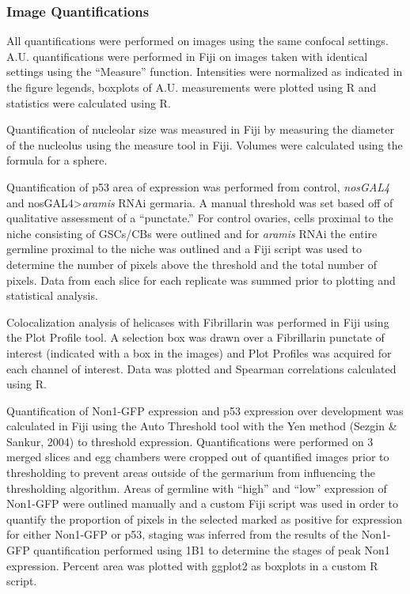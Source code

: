 \documentclass[12pt,oneside]{reedthesis}
\begin{document}
\hypertarget{image-quantifications}{%
\subsubsection{Image Quantifications}\label{image-quantifications}}

All quantifications were performed on images using the same confocal settings. A.U. quantifications were performed in Fiji on images taken with identical settings using the ``Measure'' function. Intensities were normalized as indicated in the figure legends, boxplots of A.U. measurements were plotted using R and statistics were calculated using R.

Quantification of nucleolar size was measured in Fiji by measuring the diameter of the nucleolus using the measure tool in Fiji. Volumes were calculated using the formula for a sphere.

Quantification of p53 area of expression was performed from control, \emph{nosGAL4} and nosGAL4\textgreater{}\emph{aramis} RNAi germaria. A manual threshold was set based off of qualitative assessment of a ``punctate.'' For control ovaries, cells proximal to the niche consisting of GSCs/CBs were outlined and for \emph{aramis} RNAi the entire germline proximal to the niche was outlined and a Fiji script was used to determine the number of pixels above the threshold and the total number of pixels. Data from each slice for each replicate was summed prior to plotting and statistical analysis.

Colocalization analysis of helicases with Fibrillarin was performed in Fiji using the Plot Profile tool. A selection box was drawn over a Fibrillarin punctate of interest (indicated with a box in the images) and Plot Profiles was acquired for each channel of interest. Data was plotted and Spearman correlations calculated using R.

Quantification of Non1-GFP expression and p53 expression over development was calculated in Fiji using the Auto Threshold tool with the Yen method (Sezgin \& Sankur, 2004) to threshold expression. Quantifications were performed on 3 merged slices and egg chambers were cropped out of quantified images prior to thresholding to prevent areas outside of the germarium from influencing the thresholding algorithm. Areas of germline with ``high'' and ``low'' expression of Non1-GFP were outlined manually and a custom Fiji script was used in order to quantify the proportion of pixels in the selected marked as positive for expression for either Non1-GFP or p53, staging was inferred from the results of the Non1-GFP quantification performed using 1B1 to determine the stages of peak Non1 expression. Percent area was plotted with ggplot2 as boxplots in a custom R script.
\end{document}
